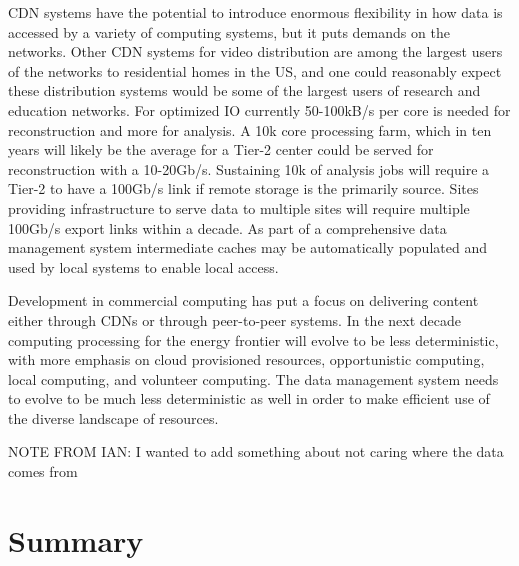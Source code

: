 CDN systems have the potential to introduce enormous flexibility in how data is accessed by a variety of computing systems, but it puts demands on the networks.   Other CDN systems for video distribution are among the largest users of the networks to residential homes in the US, and one could reasonably expect these distribution systems would be some of the largest users of research and education networks.   For optimized IO currently 50-100kB/s per core is needed for reconstruction and more for analysis.   A 10k core processing farm, which in ten years will likely be the average for a Tier-2 center could be served for reconstruction with a 10-20Gb/s.    Sustaining 10k of analysis jobs will require a Tier-2 to have a 100Gb/s link if remote storage is the primarily source.   Sites providing infrastructure to serve data to multiple sites will require multiple 100Gb/s export links within a decade.  As part of a comprehensive data management system intermediate caches may be automatically populated and used by local systems to enable local access.   

Development in commercial computing has put a focus on delivering content either through CDNs or through peer-to-peer systems.    In the next decade computing processing for the energy frontier will evolve to be less deterministic, with more emphasis on cloud provisioned resources, opportunistic computing, local computing, and volunteer computing.    The data management system needs to evolve to be much less deterministic as well in order to make efficient use of the diverse landscape of resources. 

NOTE FROM IAN: I wanted to add something about not caring where the data comes from 

\section{Summary}
\label{sec:comp-summary}




